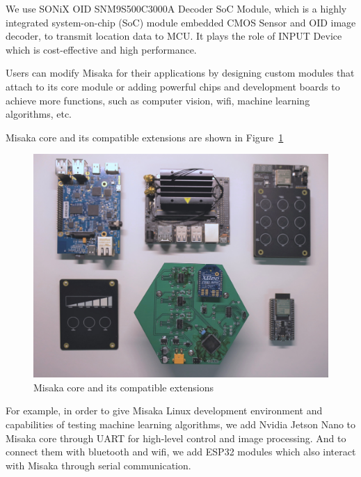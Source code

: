 \documentclass[conference]{IEEEtran}
\begin{document}
We use SONiX OID SNM9S500C3000A Decoder SoC Module, which is a highly integrated system-on-chip (SoC) module embedded CMOS Sensor and OID image decoder, to transmit location data to MCU. It plays the role of INPUT Device which is cost-effective and high performance.




Users can modify Misaka for their applications by designing custom modules that attach to its core module or adding powerful chips and development boards to achieve more functions, such as computer vision, wifi, machine learning algorithms, etc.

Misaka core and its compatible extensions are shown in Figure~\ref{fig:extension}

\begin{figure}[htbp]
    \centering
    \includegraphics[width=0.8\columnwidth]{extensions.jpg}
    \caption{Misaka core and its compatible extensions}
    \label{fig:extension}
\end{figure}

For example, in order to give Misaka Linux development environment and capabilities of testing machine learning algorithms, we add Nvidia Jetson Nano to Misaka core through UART for high-level control and image processing. And to connect them with bluetooth and wifi, we add ESP32 modules which also interact with Misaka through serial communication. 



\end{document}
